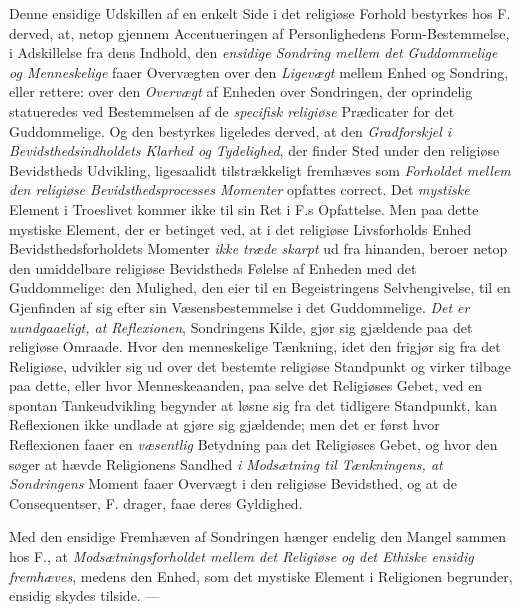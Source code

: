  Denne ensidige Udskillen af en enkelt Side i det religiøse Forhold bestyrkes hos
F. derved, at, netop gjennem Accentueringen af Personlighedens Form-Bestemmelse,
i Adskillelse fra dens Indhold, den \emph{ensidige Sondring mellem det
Guddommelige og Menneskelige} faaer Overvægten over den \emph{Ligevægt} mellem
Enhed og Sondring, eller rettere: over den \emph{Overvægt} af Enheden over
Sondringen, der oprindelig statueredes ved Bestemmelsen af de \emph{specifisk
religiøse} Prædicater for det Guddommelige. Og den bestyrkes ligeledes derved, at
den \emph{Gradforskjel i Bevidsthedsindholdets Klarhed og Tydelighed}, der finder
Sted under den religiøse Bevidstheds Udvikling, ligesaalidt tilstrækkeligt
fremhæves som \emph{Forholdet mellem den religiøse Bevidsthedsprocesses Momenter}
opfattes correct. Det \emph{mystiske} Element i Troeslivet kommer ikke til sin
Ret i F.s Opfattelse. Men paa dette mystiske Element, der er betinget ved, at i
det religiøse Livsforholds Enhed Bevidsthedsforholdets Momenter \emph{ikke træde
skarpt} ud fra hinanden, beroer netop den umiddelbare religiøse Bevidstheds
Følelse af Enheden med det Guddommelige: den Mulighed, den eier til en
Begeistringens Selvhengivelse, til en Gjenfinden af sig efter sin
Væsensbestemmelse i det Guddommelige. \emph{Det er uundgaaeligt, at Reflexionen},
Sondringens Kilde, gjør sig gjældende paa det religiøse Omraade. Hvor den
menneskelige Tænkning, idet den frigjør sig fra det Religiøse, udvikler sig ud
over det bestemte religiøse Standpunkt og virker tilbage paa dette, eller hvor
Menneskeaanden, paa selve det Religiøses Gebet, ved en spontan Tankeudvikling
begynder at løsne sig fra det tidligere Standpunkt, kan Reflexionen ikke undlade
at gjøre sig gjældende; men det er først hvor Reflexionen faaer en
\emph{væsentlig} Betydning paa det Religiøses Gebet, og hvor den søger at hævde
Religionens Sandhed \emph{i Modsætning til Tænkningens, at Sondringens} Moment
faaer Overvægt i den religiøse Bevidsthed, og at de Consequentser, F. drager,
faae deres Gyldighed.

Med den ensidige Fremhæven af Sondringen hænger
 endelig den Mangel sammen hos F., at \emph{Modsætningsforholdet mellem det
Religiøse og det Ethiske ensidig fremhæves}, medens den Enhed, som det mystiske
Element i Religionen begrunder, ensidig skydes tilside. ---

